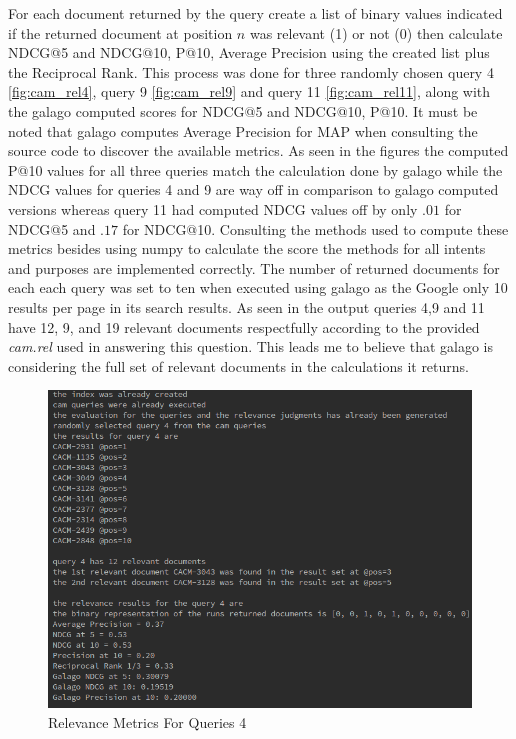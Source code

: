\documentclass[11pt]{article}
\begin{document}
For each document returned by the query create a list of binary values indicated if the returned document at position $n$ was relevant (1) or not (0) then calculate NDCG@5 and NDCG@10, P@10, Average Precision using the created list plus the Reciprocal Rank. This process was done for three randomly chosen query 4 \autoref{fig:cam_rel4}, query 9 \autoref{fig:cam_rel9} and query 11 \autoref{fig:cam_rel11}, along with the galago computed scores for NDCG@5 and NDCG@10, P@10. It must be noted that galago computes Average Precision for MAP when consulting the source code to discover the available metrics. As seen in the figures the computed P@10 values for all three queries match the calculation done by galago while the NDCG values for queries 4 and 9 are way off in comparison to galago computed versions whereas query 11 had computed NDCG values off by only $.01$ for NDCG@5 and $.17$ for NDCG@10. Consulting the methods used to compute these metrics besides using numpy to calculate the score the methods for all intents and purposes are implemented correctly.  The number of returned documents for each each query was set to ten when executed using galago as the Google only 10 results per page in its search results.  As seen in the output queries 4,9 and 11 have 12, 9, and 19 relevant  documents respectfully according to the provided \textit{cam.rel} used in answering this question. This leads me to believe that galago is considering the full set of relevant documents in the calculations it returns. 
\begin{figure}[H]
\centering
\includegraphics[scale=0.6]{q1run2.png}
\caption{Relevance Metrics For Queries 4}
\label{fig:cam_rel4}
\end{figure}
\end{document}
